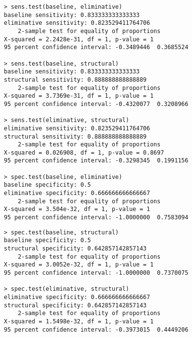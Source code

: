 \begin{mdframed}[backgroundcolor=black!5,hidealllines=true,innerleftmargin=0.2cm,innerrightmargin=0.2cm,innertopmargin=0.2cm,innerbottommargin=0.2cm,nobreak=false]
\begin{verbatim}
> sens.test(baseline, eliminative)
baseline sensitivity: 0.833333333333333
eliminative sensitivity: 0.823529411764706
    2-sample test for equality of proportions
X-squared = 2.2428e-31, df = 1, p-value = 1
95 percent confidence interval: -0.3489446  0.3685524

> sens.test(baseline, structural)
baseline sensitivity: 0.833333333333333
structural sensitivity: 0.888888888888889
    2-sample test for equality of proportions
X-squared = 3.7369e-31, df = 1, p-value = 1
95 percent confidence interval: -0.4320077  0.3208966

> sens.test(eliminative, structural)
eliminative sensitivity: 0.823529411764706
structural sensitivity: 0.888888888888889
    2-sample test for equality of proportions
X-squared = 0.026908, df = 1, p-value = 0.8697
95 percent confidence interval: -0.3298345  0.1991156

> spec.test(baseline, eliminative)
baseline specificity: 0.5
eliminative specificity: 0.666666666666667
    2-sample test for equality of proportions
X-squared = 3.504e-32, df = 1, p-value = 1
95 percent confidence interval: -1.0000000  0.7583094
\end{verbatim}
\end{mdframed}
\begin{mdframed}[backgroundcolor=black!5,hidealllines=true,innerleftmargin=0.2cm,innerrightmargin=0.2cm,innertopmargin=0.2cm,innerbottommargin=0.2cm]
\begin{verbatim}
> spec.test(baseline, structural)
baseline specificity: 0.5
structural specificity: 0.642857142857143
    2-sample test for equality of proportions
X-squared = 3.0052e-32, df = 1, p-value = 1
95 percent confidence interval: -1.0000000  0.7370075

> spec.test(eliminative, structural)
eliminative specificity: 0.666666666666667
structural specificity: 0.642857142857143
    2-sample test for equality of proportions
X-squared = 1.5498e-32, df = 1, p-value = 1
95 percent confidence interval: -0.3973015  0.4449206
\end{verbatim}
\end{mdframed}
\vspace{-1em}
